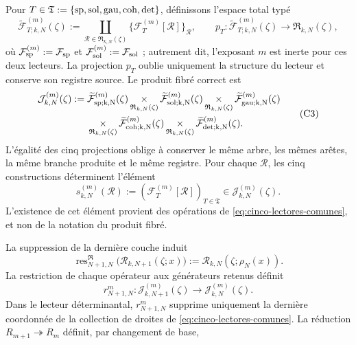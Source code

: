 Pour
\(T\in\mathfrak T:=\{{\rm sp},{\rm sol},{\rm gau},{\rm coh},{\rm det}\}\),
définissons l'espace total typé
\[
 \widetilde{\mathcal F}_{T;k,N}^{(m)}(\zeta)
 :=\coprod_{\mathscr R\in\mathfrak R_{k,N}(\zeta)}
   \{\mathcal F_T^{(m)}[\mathscr R]\}_{\mathscr R},
 \qquad
 p_T:\widetilde{\mathcal F}_{T;k,N}^{(m)}(\zeta)
      \longrightarrow\mathfrak R_{k,N}(\zeta),
\]
où \(\mathcal F_{\rm sp}^{(m)}:=\mathcal F_{\rm sp}\) et \(\mathcal F_{\rm sol}^{(m)}:=\mathcal F_{\rm sol}\) ; autrement dit, l'exposant \(m\) est inerte pour ces deux lecteurs. La projection \(p_T\) oublie uniquement la structure du lecteur et conserve son registre source. Le produit fibré correct est
\[
\begin{aligned}
 \mathcal J_{k,N}^{(m)}(\zeta):={}&
 \widetilde{\mathcal F}_{\rm sp;k,N}^{(m)}(\zeta)
 \mathop{\times}_{\mathfrak R_{k,N}(\zeta)}
 \widetilde{\mathcal F}_{\rm sol;k,N}^{(m)}(\zeta)
 \mathop{\times}_{\mathfrak R_{k,N}(\zeta)}
 \widetilde{\mathcal F}_{\rm gau;k,N}^{(m)}(\zeta)\\
 &\mathop{\times}_{\mathfrak R_{k,N}(\zeta)}
 \widetilde{\mathcal F}_{\rm coh;k,N}^{(m)}(\zeta)
 \mathop{\times}_{\mathfrak R_{k,N}(\zeta)}
 \widetilde{\mathcal F}_{\rm det;k,N}^{(m)}(\zeta).
\end{aligned}
\tag{C3}
\label{eq:constructor-correlativo}
\]
L'égalité des cinq projections oblige à conserver le même arbre, les
mêmes arêtes, la même branche produite et le même registre. Pour chaque
\(\mathscr R\), les cinq constructions déterminent l'élément
\[
 s_{k,N}^{(m)}(\mathscr R)
 :=(\mathcal F_T^{(m)}[\mathscr R])_{T\in\mathfrak T}
 \in\mathcal J_{k,N}^{(m)}(\zeta).
\]
L'existence de cet élément provient des opérations de \eqref{eq:cinco-lectores-comunes}, et non de la notation du produit fibré.

La suppression de la dernière couche induit
\[
 \operatorname{res}^{\mathfrak R}_{N+1,N}
 \bigl(\mathscr R_{k,N+1}(\zeta;x)\bigr)
 :=\mathscr R_{k,N}(\zeta;\rho_N(x)).
\]
La restriction de chaque opérateur aux générateurs retenus définit
\[
 r^m_{N+1,N}:\mathcal J_{k,N+1}^{(m)}(\zeta)
 \longrightarrow\mathcal J_{k,N}^{(m)}(\zeta).
\]
Dans le lecteur déterminantal, \(r^m_{N+1,N}\) supprime uniquement la dernière
coordonnée de la collection de droites de
\eqref{eq:cinco-lectores-comunes}. La réduction
\(R_{m+1}\twoheadrightarrow R_m\) définit, par changement de base,

